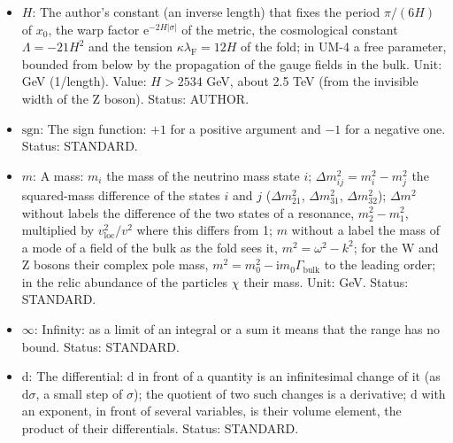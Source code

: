 \documentclass[
  10pt,
]{article}
\begin{document}
\begin{itemize}
  respect to \(x_4\) (\(a_4' = \mathrm{d}a_4/\mathrm{d}x_4\); two primes
  the second derivative); on a function of \(\sigma\) alone (a profile)
  the derivative with respect to \(\sigma\). Status: STANDARD.
\item
  \(H\): The author's constant (an inverse length) that fixes the period
  \(\pi/(6H)\) of \(x_0\), the warp factor
  \(\mathrm{e}^{-2H\lvert\sigma\rvert}\) of the metric, the cosmological
  constant \(\Lambda = -21H^2\) and the tension
  \(\kappa\lambda_{\mathrm{F}} = 12H\) of the fold; in UM-4 a free
  parameter, bounded from below by the propagation of the gauge fields
  in the bulk. Unit: GeV (1/length). Value: \(H > 2534\) GeV, about 2.5
  TeV (from the invisible width of the Z boson). Status: AUTHOR.
\item
  \(\mathrm{sgn}\): The sign function: \(+1\) for a positive argument
  and \(-1\) for a negative one. Status: STANDARD.
\item
  \(m\): A mass: \(m_i\) the mass of the neutrino mass state \(i\);
  \(\Delta m_{ij}^2 = m_i^2 - m_j^2\) the squared-mass difference of the
  states \(i\) and \(j\) (\(\Delta m_{21}^2\), \(\Delta m_{31}^2\),
  \(\Delta m_{32}^2\)); \(\Delta m^2\) without labels the difference of
  the two states of a resonance, \(m_2^2 - m_1^2\), multiplied by
  \(v_{\mathrm{loc}}^2/v^2\) where this differs from 1; \(m\) without a
  label the mass of a mode of a field of the bulk as the fold sees it,
  \(m^2 = \omega^2 - k^2\); for the W and Z bosons their complex pole
  mass, \(m^2 = m_0^2 - \mathrm{i}m_0\Gamma_{\mathrm{bulk}}\) to the
  leading order; in the relic abundance of the particles \(\chi\) their
  mass. Unit: GeV. Status: STANDARD.
\item
  \(\infty\): Infinity: as a limit of an integral or a sum it means that
  the range has no bound. Status: STANDARD.
\item
  \(\mathrm{d}\): The differential: \(\mathrm{d}\) in front of a
  quantity is an infinitesimal change of it (as \(\mathrm{d}\sigma\), a
  small step of \(\sigma\)); the quotient of two such changes is a
  derivative; \(\mathrm{d}\) with an exponent, in front of several
  variables, is their volume element, the product of their
  differentials. Status: STANDARD.
\end{itemize}
\end{document}
